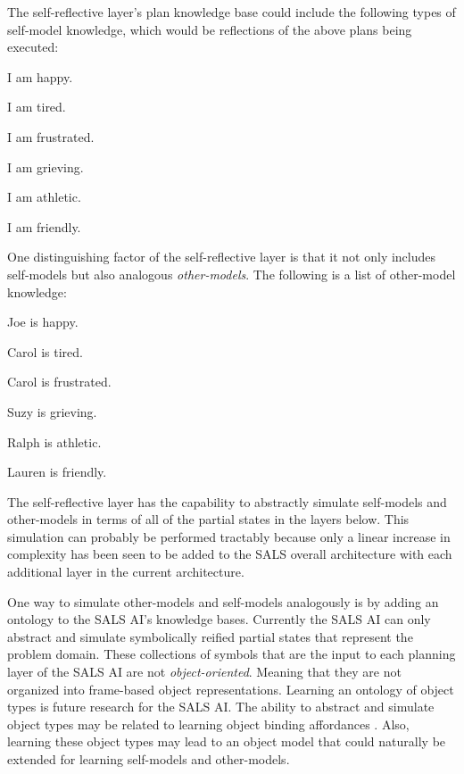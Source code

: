 \noindent The self-reflective layer's plan knowledge base could include the
following types of self-model knowledge, which would be reflections of
the above plans being executed:

\begin{packed_itemize}
\item{I am happy.}
\item{I am tired.}
\item{I am frustrated.}
\item{I am grieving.}
\item{I am athletic.}
\item{I am friendly.}
\end{packed_itemize}

\noindent One distinguishing factor of the self-reflective layer is
that it not only includes self-models but also analogous
{\emph{other-models}}.  The following is a list of other-model
knowledge:

\begin{packed_itemize}
\item{Joe is happy.}
\item{Carol is tired.}
\item{Carol is frustrated.}
\item{Suzy is grieving.}
\item{Ralph is athletic.}
\item{Lauren is friendly.}
\end{packed_itemize}

\noindent The self-reflective layer has the capability to abstractly
simulate self-models and other-models in terms of all of the partial
states in the layers below.  This simulation can probably be performed
tractably because only a linear increase in complexity has been seen
to be added to the SALS overall architecture with each additional
layer in the current architecture.

One way to simulate other-models and self-models analogously is by
adding an ontology to the SALS AI's knowledge bases.  Currently the
SALS AI can only abstract and simulate symbolically reified partial
states that represent the problem domain.  These collections of
symbols that are the input to each planning layer of the SALS AI are
not {\emph{object-oriented}}.  Meaning that they are not organized
into frame-based object representations.  Learning an ontology of
object types is future research for the SALS AI.  The ability to
abstract and simulate object types may be related to learning object
binding affordances \cite[]{stoytchev:2005}.  Also, learning these
object types may lead to an object model that could naturally be
extended for learning self-models and other-models.

